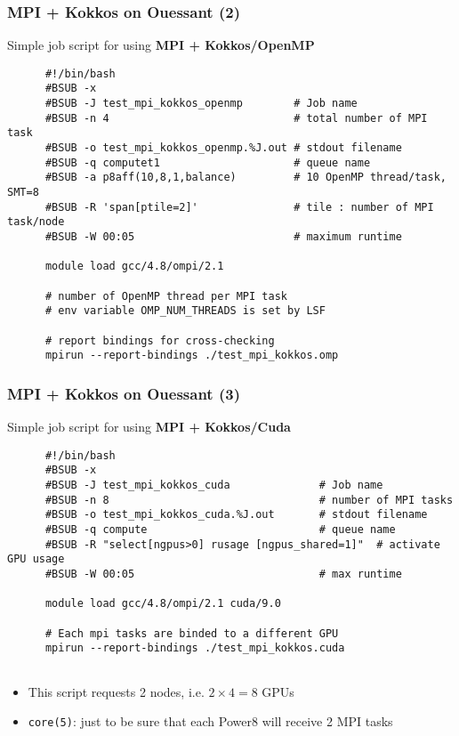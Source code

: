 \begin{frame}[fragile=singleslide]
  \frametitle{MPI + Kokkos on Ouessant (2)}

  {\Large Simple job script for using \textbf{MPI + Kokkos/OpenMP}}

  {\small
    \begin{verbatim}
      #!/bin/bash
      #BSUB -x
      #BSUB -J test_mpi_kokkos_openmp        # Job name
      #BSUB -n 4                             # total number of MPI task
      #BSUB -o test_mpi_kokkos_openmp.%J.out # stdout filename
      #BSUB -q computet1                     # queue name
      #BSUB -a p8aff(10,8,1,balance)         # 10 OpenMP thread/task, SMT=8
      #BSUB -R 'span[ptile=2]'               # tile : number of MPI task/node
      #BSUB -W 00:05                         # maximum runtime
            
      module load gcc/4.8/ompi/2.1
      
      # number of OpenMP thread per MPI task
      # env variable OMP_NUM_THREADS is set by LSF
      
      # report bindings for cross-checking
      mpirun --report-bindings ./test_mpi_kokkos.omp
    \end{verbatim}
  }
\end{frame}

\begin{frame}[fragile=singleslide]
  \frametitle{MPI + Kokkos on Ouessant (3)}

  {\Large Simple job script for using \textbf{MPI + Kokkos/Cuda}}

  {\small
    \begin{verbatim}
      #!/bin/bash
      #BSUB -x
      #BSUB -J test_mpi_kokkos_cuda              # Job name
      #BSUB -n 8                                 # number of MPI tasks
      #BSUB -o test_mpi_kokkos_cuda.%J.out       # stdout filename
      #BSUB -q compute                           # queue name
      #BSUB -R "select[ngpus>0] rusage [ngpus_shared=1]"  # activate GPU usage
      #BSUB -W 00:05                             # max runtime
            
      module load gcc/4.8/ompi/2.1 cuda/9.0
      
      # Each mpi tasks are binded to a different GPU
      mpirun --report-bindings ./test_mpi_kokkos.cuda
      
    \end{verbatim}
  }
  \begin{itemize}
    \item This script requests 2 nodes, i.e. $2\times4=8$ GPUs
  \item \texttt{core(5)}: just to be sure that each Power8 will receive 2 MPI tasks
  \end{itemize}
\end{frame}

